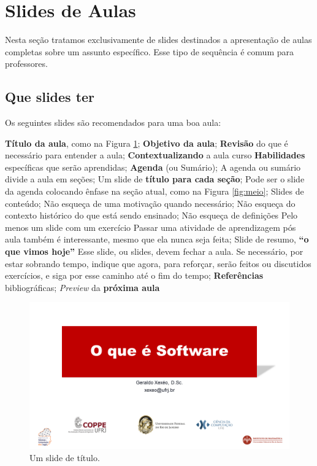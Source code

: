 \section{Slides de Aulas}

Nesta seção tratamos exclusivamente de slides destinados a apresentação de aulas completas sobre um assunto específico. Esse tipo de sequência é comum para professores.

\subsection{Que slides ter}

Os seguintes slides são recomendados para uma boa aula:
\begin{outline}
    \1 \textbf{Título da aula}, como na Figura \ref{fig:titulo};
    \1 \textbf{Objetivo da aula};
    \1 \textbf{Revisão} do que é necessário para entender a aula;
    \2 \textbf{Contextualizando} a aula curso
    \1 \textbf{Habilidades} específicas que serão aprendidas;
    \1 \textbf{Agenda} (ou Sumário);
    \2 A agenda ou sumário divide a aula em seções;
    \1 Um slide de \textbf{título para cada seção};
    \2 Pode ser o slide da agenda colocando ênfase na seção atual, como na Figura \ref{fig:meio};
    \1 Slides de conteúdo;
    \2 Não esqueça de uma motivação quando necessário;
    \2 Não esqueça do contexto histórico do que está sendo ensinado;
    \2 Não esqueça de definições
    \1 Pelo menos um slide com um exercício
    \2 Passar uma atividade de aprendizagem pós aula também é interessante, mesmo que ela nunca seja feita;
    \1 Slide de resumo, \textbf{``o que vimos hoje''}
    \2 Esse slide, ou slides, devem fechar a aula. Se necessário, por estar sobrando tempo, indique que agora, para reforçar, serão feitos ou discutidos exercícios, e siga por esse caminho até o fim do tempo;
    \1 \textbf{Referências} bibliográficas;
    \1 \textit{Preview} da \textbf{próxima aula}
\end{outline}



\begin{figure}[ht]
    \centering
    \includegraphics[width=\tam\linewidth,frame]{imagens/capa.png}
    \caption{Um slide de título.}
    \label{fig:titulo}
\end{figure}

